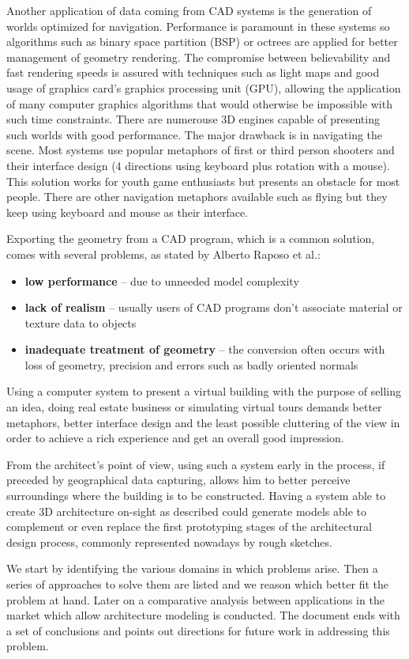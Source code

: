 Another application of data coming from CAD systems is the generation of worlds optimized for navigation.
Performance is paramount in these systems so algorithms such as binary space partition (BSP) or octrees are applied
for better management of geometry rendering. The compromise between believability and fast rendering speeds
is assured with techniques such as light maps and good usage of graphics card's graphics processing unit (GPU),
allowing the application of many computer graphics algorithms that would otherwise be impossible with such time constraints.
There are numerouse 3D engines capable of presenting such worlds with good performance.
The major drawback is in navigating the scene. Most systems use popular metaphors of first or third person shooters and
their interface design (4 directions using keyboard plus rotation with a mouse). This solution works for youth
game enthusiasts but presents an obstacle for most people. There are other navigation metaphors available such as flying
but they keep using keyboard and mouse as their interface.

Exporting the geometry from a CAD program, which is a common solution, comes with several problems,
as stated by Alberto Raposo et al.\cite{CADVR06}:
\begin{itemize}
	\item \textbf{low performance} -- due to unneeded model complexity
	\item \textbf{lack of realism} -- usually users of CAD programs don't associate material
	or texture data to objects
	\item \textbf{inadequate treatment of geometry} -- the conversion often occurs with loss of
	geometry, precision and errors such as badly oriented normals
\end{itemize}

Using a computer system to present a virtual building with the purpose of selling an idea, doing real estate business
or simulating virtual tours demands better metaphors, better interface design and the least possible cluttering
of the view in order to achieve a rich experience and get an overall good impression.

From the architect's point of view, using such a system early in the process, if preceded by geographical data capturing,
allows him to better perceive surroundings where the building is to be constructed.
Having a system able to create 3D architecture on-sight as described could generate models able to
complement or even replace the first prototyping stages of the architectural design process,
commonly represented nowadays by rough sketches.

We start by identifying the various domains in which problems arise. Then a series of approaches to solve them are
listed and we reason which better fit the problem at hand. Later on a comparative analysis between applications
in the market which allow architecture modeling is conducted. The document ends with a set of conclusions and
points out directions for future work in addressing this problem.
